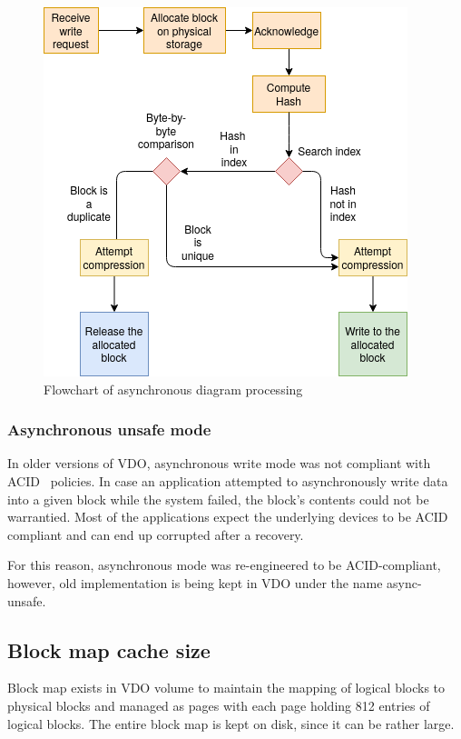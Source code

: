\documentclass[
  color, %
  table, %
  lof,   %
  lot,   %
]{fithesis3}
\begin{document}
\begin{figure}[!htb]
        \centering
        \includegraphics[width=\textwidth]{graphics/diagrams/async.png}
\caption[Asynchronous write mode]{Flowchart of asynchronous diagram processing}
\label{fig:async}
\end{figure}

\subsubsection{Asynchronous unsafe mode}
In older versions of VDO, asynchronous write mode was not compliant with ACID~\cite{Haerder83principlesof} policies. In case an application attempted to asynchronously write data into a given block while the system failed, the block's contents could not be warrantied. Most of the applications expect the underlying devices to be ACID compliant and can end up corrupted after a recovery.

For this reason, asynchronous mode was re-engineered to be ACID-compliant, however, old implementation is being kept in VDO under the name async-unsafe.~\cite{asyncunsafe}

\subsection{Block map cache size}
Block map exists in VDO volume to maintain the mapping of logical blocks to physical blocks and managed as pages with each page holding 812 entries of logical blocks. The entire block map is kept on disk, since it can be rather large.
\end{document}

